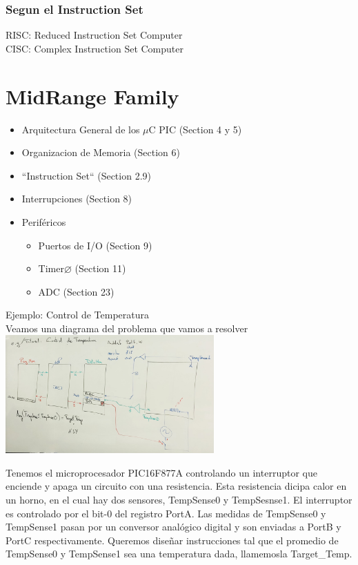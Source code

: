 \documentclass{report}
\begin{document}
\subsection{Segun el Instruction Set}
{\large RISC}: Reduced Instruction Set Computer \\

{\large CISC}: Complex Instruction Set Computer


\chapter{MidRange Family}

\begin{itemize}
	\item Arquitectura General de los \(\mu\)C PIC (Section 4 y 5)
	\item Organizacion de Memoria (Section 6)
	\item ``Instruction Set`` (Section 2.9)
	\item Interrupciones (Section 8)
	\item Periféricos \begin{itemize}
		      \item Puertos de I/O (Section 9)
		      \item Timer\(\varnothing\) (Section 11)
		      \item ADC (Section 23)
	      \end{itemize}
\end{itemize}


\newpage
Ejemplo: Control de Temperatura\\

Veamos una diagrama del problema que vamos a resolver\\
\includegraphics[width=8cm]{../Assets/Temp_Control_Problema.jpg}

Tenemos el microprocesador PIC16F877A controlando un interruptor que enciende y apaga un circuito con una resistencia.
Esta resistencia dicipa calor en un horno, en el cual hay dos sensores, TempSense0 y TempSesnse1.
El interruptor es controlado por el bit-0 del registro PortA. Las medidas de TempSense0 y TempSense1 pasan por un conversor analógico digital y son enviadas a PortB y PortC respectivamente.
Queremos diseñar instrucciones tal que el promedio de TempSense0 y TempSense1 sea una temperatura dada, llamemosla Target\_Temp.\\
\end{document}
